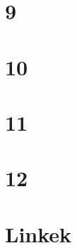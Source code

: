 \begin{spacing}{1.4}
\section*{9} \label{DBprojektharmadikharmadik9}
\Desc{

}
\vspace{0.5cm}
\newpage
\section*{10} \label{DBprojektharmadikharmadik10}
\Desc{

}
\vspace{0.5cm}
\newpage
\section*{11} \label{DBprojektharmadikharmadik11}
\Desc{

}
\vspace{0.5cm}
\newpage
\section*{12} \label{DBprojektharmadikharmadik12}
\Desc{

}
\vspace{0.5cm}
\newpage
\section*{Linkek} \label{DBlink}
\Desc{

}
\vspace{0.5cm}
\newpage

\end{spacing}


